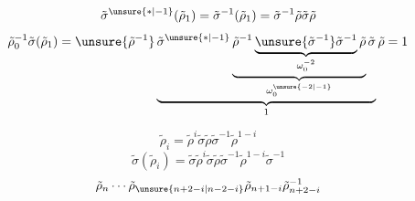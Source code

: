 \[
\tilde\sigma^{\unsure{\ast|-1}}(\tilde\rho_1)
=\tilde\sigma^{-1}(\tilde\rho_1)
=\tilde\sigma^{-1}\tilde\rho\tilde\sigma\tilde\rho
\]
\[
\tilde\rho_0^{-1}\tilde\sigma(\tilde\rho_1)
=\unsure{\tilde\rho^{-1}}
\underbrace{\tilde\sigma^{\unsure{\ast|-1}}
\underbrace{\tilde\rho^{-1}
\underbrace{\unsure{\tilde\sigma^{-1}}\tilde\sigma^{-1}}_{
\omega_0^{-2}}\tilde\rho}_{\omega_0^{\unsure{-2|-1}}}
\tilde\sigma}_{1}\tilde\rho=1
\]

\deleted{$\unsure{\sigma|\rho}$}
\[
\tilde\rho_i=\tilde\rho^i\tilde\sigma\tilde\rho\tilde\sigma^{-1}\tilde\rho^{1-i}
\]
\[
\tilde\sigma(\tilde\rho_i)
=\tilde\sigma\tilde\rho^i\tilde\sigma\tilde\rho\tilde\sigma^{-1}\tilde\rho^{1-i}\tilde\sigma^{-1}
\]
\[
\tilde\rho_n\cdots\tilde\rho_{\unsure{n+2-i|n-2-i}}\tilde\rho_{n+1-i}\tilde\rho_{n+2-i}^{-1}
\]
